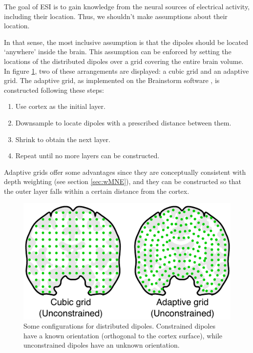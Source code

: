 The goal of ESI is to gain knowledge from the neural sources of electrical activity, including their location. 
%
Thus, we shouldn't make assumptions about their location.

In that sense, the most inclusive assumption is that the dipoles should be located `anywhere' inside the brain.
%
This assumption can be enforced by setting the locations of the distributed dipoles over a grid covering the entire brain volume.
%
In figure \ref{fig:dipoles}, two of these arrangements are displayed: a cubic grid and an adaptive grid. 
%
The adaptive grid, as implemented on the Brainstorm software \cite{brainstorm}, is constructed following these steps:
\begin{enumerate}
    \item Use cortex as the initial layer.
    \item Downsample to locate dipoles with a prescribed distance between them.
    \item Shrink to obtain the next layer.
    \item Repeat until no more layers can be constructed.
\end{enumerate}

Adaptive grids offer some advantages since they are conceptually consistent with depth weighting (see section \ref{sec:wMNE}), and they can be constructed so that the outer layer falls within a certain distance from the cortex.

\begin{figure}[ht]
\centering
\includegraphics{./img/Pregions_pic_radial_v2.pdf}
\caption{Some configurations for distributed dipoles. Constrained dipoles have a known orientation (orthogonal to the cortex surface), while unconstrained dipoles have an unknown orientation.}
\label{fig:dipoles}
\end{figure}

